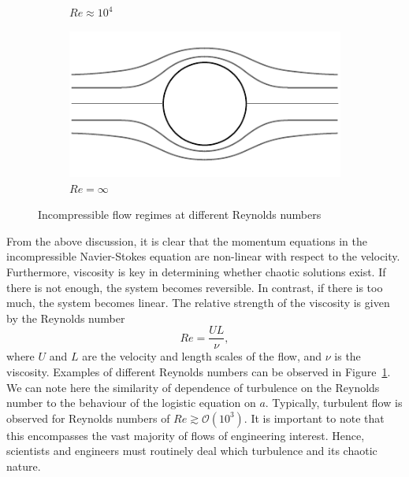 \begin{figure}[tbp]
\begin{subfigure}[b]{0.40\textwidth}
		\caption{$Re\approx10^4$}
	\end{subfigure}
	\begin{subfigure}[b]{0.40\textwidth}
		\includegraphics[width=\linewidth]{Pictures/cylinder_1}
		\caption{$Re=\infty$}
	\end{subfigure}
	\caption{Incompressible flow regimes at different Reynolds numbers}
	\label{fig:flow_regimes}
\end{figure}
From the above discussion, it is clear that the momentum equations in the incompressible Navier-Stokes equation are non-linear with respect to the velocity. Furthermore, viscosity is key in determining whether chaotic solutions exist. If there is not enough, the system becomes reversible. In contrast, if there is too much, the system becomes linear. The relative strength of the viscosity is given by the Reynolds number
\begin{equation}
	Re = \frac{UL}{\nu},
\end{equation}
where $U$ and $L$ are the velocity and length scales of the flow, and $\nu$ is the viscosity. Examples of different Reynolds numbers can be observed in Figure~\ref{fig:flow_regimes}. We can note here the similarity of dependence of turbulence on the Reynolds number to the behaviour of the logistic equation on $a$. Typically, turbulent flow is observed for Reynolds numbers of $Re \gtrsim \mathcal{O}(10^3)$. It is important to note that this encompasses the vast majority of flows of engineering interest. Hence, scientists and engineers must routinely deal which turbulence and its chaotic nature.



